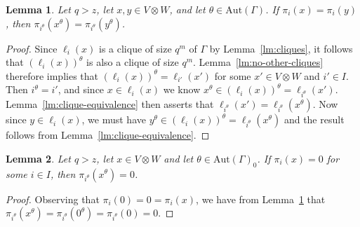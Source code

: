 \documentclass[10pt]{amsart}
\theoremstyle{definition}
\theoremstyle{plain}
\newtheorem{lemma}[lemma]{Lemma}
\theoremstyle{plain}
\theoremstyle{plain}
\theoremstyle{plain}
\newcommand{\Aut}{\mathrm{Aut}}
\begin{document}
\begin{lemma} \label{lm:automorphisms-permute-cliques}
Let $q > z$, let $x, y \in V \otimes W$, and let $\theta \in \Aut{\left(\Gamma \right)}$. If $\pi_i{\left(x \right)} = \pi_i{\left(y \right)}$, then $\pi_{i^\theta}{\left(x^\theta \right)} = \pi_{i^\theta}{\left(y^\theta \right)}$.
\end{lemma}
\begin{proof}
Since $\ell_i{\left(x \right)}$ is a clique of size $q^m$ of $\Gamma$ by Lemma~\ref{lm:cliques}, it follows that $\left(\ell_i{\left(x \right)}\right)^\theta$ is also a clique of size $q^m$. Lemma~\ref{lm:no-other-cliques} therefore implies that $\left(\ell_i{\left(x \right)}\right)^\theta = \ell_{i'}{\left(x' \right)}$ for some $x' \in V \otimes W$ and $i' \in I$. Then $i^\theta = i'$, and since $x \in \ell_i{\left(x \right)}$ we know $x^\theta \in \left(\ell_i{\left(x \right)}\right)^\theta = \ell_{i^\theta}{\left(x' \right)}$. Lemma~\ref{lm:clique-equivalence} then asserts that $\ell_{i^\theta}{\left(x' \right)} = \ell_{i^\theta}{\left(x^\theta \right)}$. Now since $y \in \ell_i{\left(x \right)}$, we must have $y^\theta \in \left(\ell_i{\left(x \right)}\right)^\theta = \ell_{i^\theta}{\left(x^\theta \right)}$ and the result follows from Lemma~\ref{lm:clique-equivalence}.
\end{proof}

\begin{lemma} \label{lm:image-of-projection-to-zero}
Let $q > z$, let $x \in V \otimes W$ and let $\theta \in \Aut{\left(\Gamma \right)}_0$. If $\pi_i{\left(x \right)} = 0$ for some $i \in I$, then $\pi_{i^\theta}{\left(x^\theta \right)} = 0$.
\end{lemma}
\begin{proof}
Observing that $\pi_i{\left(0 \right)} = 0 = \pi_i{\left(x \right)}$, we have from Lemma~\ref{lm:automorphisms-permute-cliques} that $\pi_{i^\theta}{\left(x^\theta \right)} = \pi_{i^\theta}{\left(0^\theta \right)} = \pi_{i^\theta}{\left(0 \right)} = 0$.
\end{proof}
\end{document}
